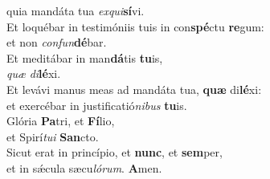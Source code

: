 \oddverse quia mandáta tua \textit{ex}\textit{qui}\textbf{sí}vi.\\
\evenverse Et loquébar in testimóniis tuis in con\textbf{spé}ctu \textbf{re}gum:~\*\\
\evenverse et non \textit{con}\textit{fun}\textbf{dé}bar.\\
\oddverse Et meditábar in man\textbf{dá}tis \textbf{tu}is,~\*\\
\oddverse \textit{quæ} \textit{di}\textbf{lé}xi.\\
\evenverse Et levávi manus meas ad mandáta tua, \textbf{quæ} di\textbf{lé}xi:~\*\\
\evenverse et exercébar in justificatió\textit{ni}\textit{bus} \textbf{tu}is.\\
\oddverse Glória \textbf{Pa}tri, et \textbf{Fí}lio,~\*\\
\oddverse et Spirí\textit{tu}\textit{i} \textbf{San}cto.\\
\evenverse Sicut erat in princípio, et \textbf{nunc}, et \textbf{sem}per,~\*\\
\evenverse et in sǽcula sæcu\textit{ló}\textit{rum}. \textbf{A}men.\\
